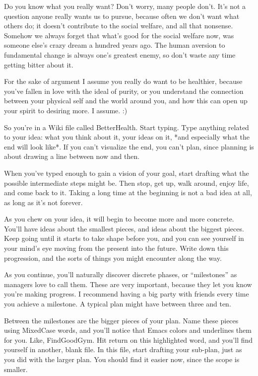 \documentclass[12pt,a4paper,onecolumn]{article}
\begin{document}
\begin{sffamily}
Do you know what you really want? Don't worry, many people don't. It's not a question anyone really
wants us to pursue, because often we don't want what others do; it doesn't contribute to the social
welfare, and all that nonsense. Somehow we always forget that what's good for the social welfare
now, was someone else's crazy dream a hundred years ago. The human aversion to fundamental change is
always one's greatest enemy, so don't waste any time getting bitter about it.

For the sake of argument I assume you really do want to be healthier, because you've fallen in love
with the ideal of purity, or you understand the connection between your physical self and the world
around you, and how this can open up your spirit to desiring more. I assume. :)

So you're in a Wiki file called BetterHealth. Start typing. Type anything related to your idea: what
you think about it, your ideas on it, *and especially what the end will look like*. If you can't
visualize the end, you can't plan, since planning is about drawing a line between now and then.

When you've typed enough to gain a vision of your goal, start drafting what the possible
intermediate steps might be. Then stop, get up, walk around, enjoy life, and come back to it. Taking
a long time at the beginning is not a bad idea at all, as long as it's not forever.

As you chew on your idea, it will begin to become more and more concrete. You'll have ideas about
the smallest pieces, and ideas about the biggest pieces. Keep going until it starts to take shape
before you, and you can see yourself in your mind's eye moving from the present into the future.
Write down this progression, and the sorts of things you might encounter along the way.

As you continue, you'll naturally discover discrete phases, or ``milestones'' as managers love to
call them. These are very important, because they let you know you're making progress. I recommend
having a big party with friends every time you achieve a milestone. A typical plan might have
between three and ten.

Between the milestones are the bigger pieces of your plan. Name these pieces using MixedCase words,
and you'll notice that Emacs colors and underlines them for you. Like, FindGoodGym. Hit return on
this highlighted word, and you'll find yourself in another, blank file. In this file, start drafting
your sub-plan, just as you did with the larger plan. You should find it easier now, since the scope
is smaller.


\end{sffamily}
\end{document}
